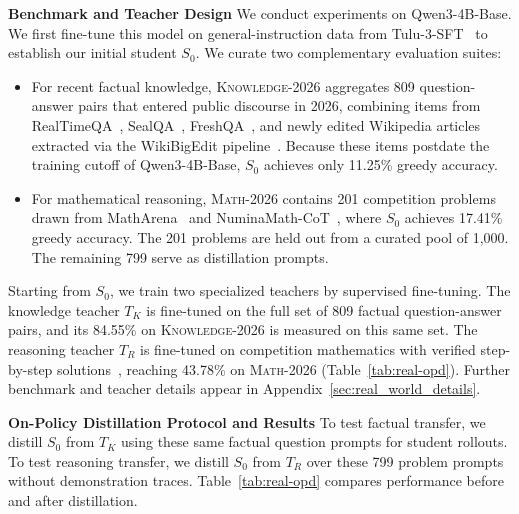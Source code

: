 \documentclass[]{template}
\theoremstyle{plain}
\theoremstyle{definition}
\theoremstyle{remark}
\renewcommand{\paragraph}[1]{\vspace{1mm}\noindent\textbf{#1}}
\begin{document}
\paragraph{Benchmark and Teacher Design}
We conduct experiments on Qwen3-4B-Base. We first fine-tune this model on general-instruction data from Tulu-3-SFT~\citep{lambert2024tulu} to establish our initial student $S_0$. We curate two complementary evaluation suites:
\begin{itemize}[leftmargin=*,noitemsep,topsep=2pt]
    \item For recent factual knowledge, \textsc{Knowledge-2026} aggregates 809 question-answer pairs that entered public discourse in 2026, combining items from RealTimeQA~\citep{kasai2023realtime}, SealQA~\citep{pham2026sealqa}, FreshQA~\citep{vu2024freshllms}, and newly edited Wikipedia articles extracted via the WikiBigEdit pipeline~\citep{pmlr-v267-thede25a}. Because these items postdate the training cutoff of Qwen3-4B-Base, $S_0$ achieves only 11.25\% greedy accuracy.
    \item For mathematical reasoning, \textsc{Math-2026} contains 201 competition problems drawn from MathArena~\citep{balunovic2026matharena} and NuminaMath-CoT~\citep{numina_math_datasets}, where $S_0$ achieves 17.41\% greedy accuracy. The 201 problems are held out from a curated pool of 1,000. The remaining 799 serve as distillation prompts.
\end{itemize}


Starting from $S_0$, we train two specialized teachers by supervised fine-tuning. The knowledge teacher $T_K$ is fine-tuned on the full set of 809 factual question-answer pairs, and its 84.55\% on \textsc{Knowledge-2026} is measured on this same set. The reasoning teacher $T_R$ is fine-tuned on competition mathematics with verified step-by-step solutions~\citep{du2026nemotronmath}, reaching 43.78\% on \textsc{Math-2026} (Table~\ref{tab:real-opd}). Further benchmark and teacher details appear in Appendix~\ref{sec:real_world_details}.

\paragraph{On-Policy Distillation Protocol and Results}
To test factual transfer, we distill $S_0$ from $T_K$ using these same factual question prompts for student rollouts. To test reasoning transfer, we distill $S_0$ from $T_R$ over these 799 problem prompts without demonstration traces. Table~\ref{tab:real-opd} compares performance before and after distillation.
\end{document}
